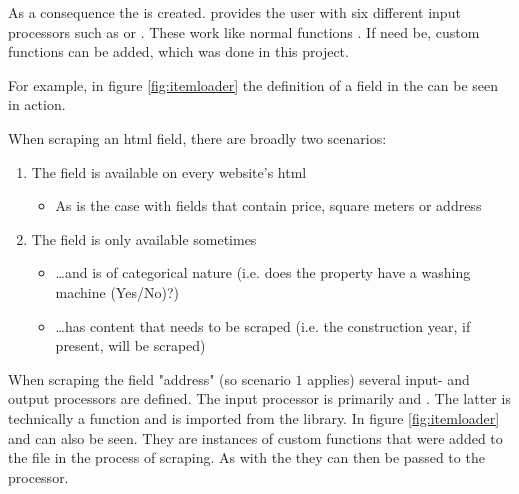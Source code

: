 \documentclass[main]{subfiles}
\begin{document}

As a consequence the \pkg[ItemLoader] is created.
\pkg[Scrapy] provides the user with six different input processors such as \pkg[TakeFirst()] or \pkg[MapCompose()].
These work like normal functions \cite{sDemystifyingScrapyItem2020}.
If need be, custom functions can be added, which was done in this project.

For example, in figure \ref{fig:itemloader} the definition of a field in the \pkg[ItemLoader] 
can be seen in action.

When scraping an \acs*{html} field, there are broadly two scenarios:
\begin{enumerate}
    \item The field is available on every website's \acs*{html}
    \begin{itemize}
        \item As is the case with fields that contain price, square meters or address
    \end{itemize}
    \item The field is only available sometimes
    \begin{itemize}
        \item …and is of categorical nature (i.e. does the property have a washing machine (Yes/No)?)
        \item …has content that needs to be scraped (i.e. the construction year, if present, will be scraped)
    \end{itemize}
\end{enumerate}

When scraping the field "address" (so scenario $1$ applies) several input- and output processors are defined.
The input processor is primarily \pkg[MapCompose()] and .
The latter is technically a function and is imported from the  library.
In figure \ref{fig:itemloader}  and   can also be seen.
They are instances of custom functions that were added to the \pkg[items.py] file in the process of scraping.
As with the  they can then be passed to the \pkg[MapCompose()] processor.
\end{document}

